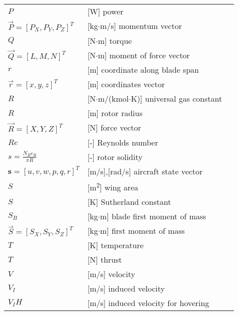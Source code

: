 \begin{longtable}[l]{ l l p{} }
  $P$                                                    & [W] power \\
  $\vec P=\left[ P_X, P_Y, P_Z \right]^T$                & [kg$\cdot$m/s] momentum vector \\
  $Q$                                                    & [N$\cdot$m] torque \\
  $\vec Q=\left[ L, M, N \right]^T$                      & [N$\cdot$m] moment of force vector \\
  $r$                                                    & [m] coordinate along blade span \\
  $\vec r=\left[ x, y, z \right]^T$                      & [m] coordinates vector \\
  $R$                                                    & [N$\cdot$m/(kmol$\cdot$K)] universal gas constant \\
  $R$                                                    & [m] rotor radius \\
  $\vec R=\left[ X, Y, Z \right]^T$                      & [N] force vector \\
  $Re$                                                   & [-] Reynolds number \\
  $s=\frac{N_B c_B}{\pi R}$                              & [-] rotor solidity \\
  $\boldsymbol s=\left[ u,v,w,p,q,r \right]^T$           & [m/s],[rad/s] aircraft state vector \\
  $S$                                                    & [m\textsuperscript{2}] wing area \\
  $S$                                                    & [K] Sutherland constant \\
  $S_B$                                                  & [kg$\cdot$m] blade first moment of mass \\
  $\vec S=\left[ S_X, S_Y, S_Z \right]^T$                & [kg$\cdot$m] first moment of mass \\
  $T$                                                    & [K] temperature \\
  $T$                                                    & [N] thrust \\
  $V$                                                    & [m/s] velocity \\
  $V_I$                                                  & [m/s] induced velocity \\
  $V_IH$                                                 & [m/s] induced velocity for hovering \\

\end{longtable}
